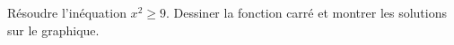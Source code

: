 
\begin{exercice}\label{exosmath-0174}

    Résoudre l'inéquation \( x^2\geq 9\). Dessiner la fonction carré et montrer les solutions sur le graphique.

\end{exercice}
